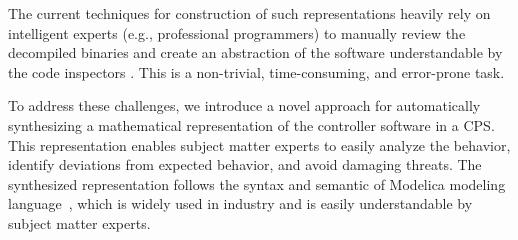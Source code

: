\documentclass[10pt,conference]{IEEEtran}
\renewcommand{\hl}[1]{#1}
\newcommand{\citeme}[1]{%
  \begingroup
  \definecolor{hlcolor}{RGB}{255, 226, 176}\sethlcolor{hlcolor}%
  [\textcolor{orange}{\hl{\textbf{CITE}}}]%
  \endgroup
}
\begin{document}
%
%
%
The current techniques for construction of such representations heavily rely on intelligent experts (e.g., professional programmers) to manually review the decompiled binaries and create an abstraction of the software understandable by the code inspectors \cite{lyu2019safety}. This is a non-trivial, time-consuming, and error-prone task. 


To address these challenges, we introduce a novel approach for automatically synthesizing a mathematical representation of the controller software in a CPS. This representation enables subject matter experts to easily analyze the behavior, identify deviations from expected behavior, and avoid damaging threats.
The synthesized representation follows the syntax and semantic of Modelica modeling language~\cite{fritzson1998modelica}, which is widely used in industry and is easily understandable by subject matter experts. 
%
\end{document}
